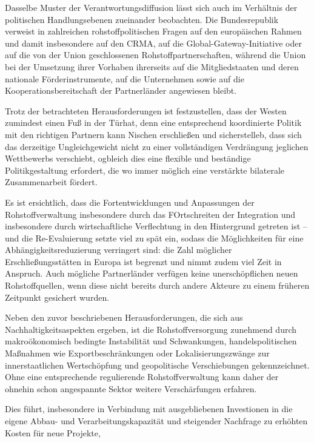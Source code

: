 \documentclass[12pt,a4paper,oneside]{book} %
\begin{document}
{Dasselbe Muster der Verantwortungsdiffusion lässt sich auch im Verhältnis der politischen Handlungsebenen zueinander beobachten. Die Bundesrepublik verweist in zahlreichen rohstoffpolitischen Fragen auf den europäischen Rahmen und damit insbesondere auf den CRMA, auf die Global-Gateway-Initiative oder auf die von der Union geschlossenen Rohstoffpartnerschaften, während die Union bei der Umsetzung ihrer Vorhaben ihrerseits auf die Mitgliedstaaten und deren nationale Förderinstrumente, auf die Unternehmen sowie auf die Kooperationsbereitschaft der Partnerländer angewiesen bleibt.

Trotz der betrachteten Herausforderungen ist festzustellen, dass der Westen zumindest \glqq einen Fuß in der Tür\grqq hat, denn eine entsprechend koordinierte Politik mit den richtigen Partnern kann Nischen erschließen und sicherstelleb, dass sich das derzeitige Ungleichgewicht nicht zu einer vollständigen Verdrängung jeglichen Wettbewerbs verschiebt, ogbleich dies eine flexible und beständige Politikgestaltung erfordert, die wo immer möglich eine verstärkte bilaterale Zusammenarbeit fördert.\autocite{McBrdige, S. 31}

Es ist ersichtlich, dass die Fortentwicklungen und Anpassungen der Rohstoffverwaltung insbesondere durch das FOrtschreiten der Integration und insbesondere durch wirtschaftliche Verflechtung in den Hintergrund getreten ist -- und die Re-Evaluierung setzte viel zu spät ein, sodass die Möglichkeiten für eine Abhängigkeitsreduzierung verringert sind: die Zahl möglicher Erschließungsstätten in Europa ist begrenzt und nimmt zudem viel Zeit in Anspruch. Auch mögliche Partnerländer verfügen keine unerschöpflichen neuen Rohstoffquellen, wenn diese nicht bereits durch andere Akteure zu einem früheren Zeitpunkt gesichert wurden.

Neben den zuvor beschriebenen Herausforderungen, die sich aus Nachhaltigkeitsaspekten ergeben, ist die Rohstoffversorgung zunehmend durch makroökonomisch bedingte Instabilität und Schwankungen, handelspolitischen Maßnahmen wie Exportbeschränkungen oder Lokalisierungszwänge zur innerstaatlichen Wertschöpfung und geopolitische Verschiebungen gekennzeichnet. Ohne eine entsprechende regulierende Rohstoffverwaltung kann daher der ohnehin schon angespannte Sektor weitere Verschärfungen erfahren.

Dies führt, insbesondere in Verbindung mit ausgebliebenen Investionen in die eigene Abbau- und Verarbeitungskapazität und steigender Nachfrage zu erhöhten Kosten für neue Projekte, 

}
\end{document}
